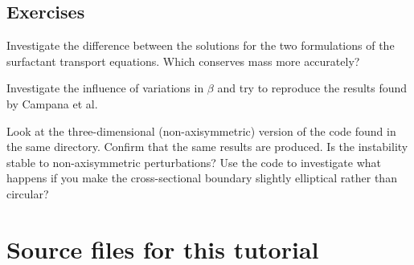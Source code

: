  

\hypertarget{index_exercises}{}\subsection{Exercises}\label{index_exercises}

\begin{DoxyEnumerate}
\item Investigate the difference between the solutions for the two formulations of the surfactant transport equations. Which conserves mass more accurately? ~\newline
~\newline

\item Investigate the influence of variations in $\beta$ and try to reproduce the results found by Campana et al.
\item Look at the three-\/dimensional (non-\/axisymmetric) version of the code found in the same directory. Confirm that the same results are produced. Is the instability stable to non-\/axisymmetric perturbations? Use the code to investigate what happens if you make the cross-\/sectional boundary slightly elliptical rather than circular?
\end{DoxyEnumerate}

 

 \hypertarget{index_sources}{}\section{Source files for this tutorial}\label{index_sources}

